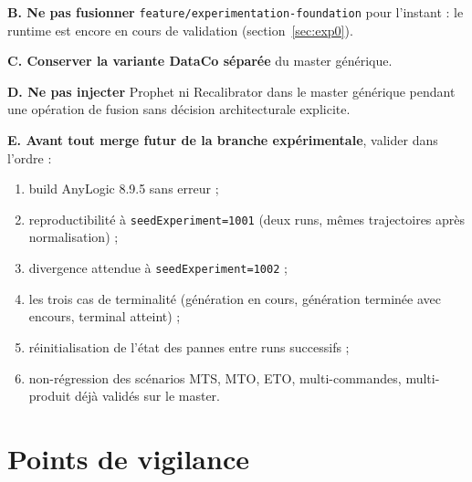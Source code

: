 \documentclass[11pt,a4paper]{article}
\newcommand{\code}[1]{\texttt{#1}}
\begin{document}
\textbf{B. Ne pas fusionner} \code{feature/experimentation-foundation}
pour l'instant : le runtime est encore en cours de validation
(section~\ref{sec:exp0}).

\textbf{C. Conserver la variante DataCo séparée} du master générique.

\textbf{D. Ne pas injecter} Prophet ni Recalibrator dans le master
générique pendant une opération de fusion sans décision architecturale
explicite.

\textbf{E. Avant tout merge futur de la branche expérimentale}, valider
dans l'ordre :

\begin{enumerate}
  \item build AnyLogic 8.9.5 sans erreur ;
  \item reproductibilité à \code{seedExperiment=1001} (deux runs, mêmes
        trajectoires après normalisation) ;
  \item divergence attendue à \code{seedExperiment=1002} ;
  \item les trois cas de terminalité (génération en cours, génération
        terminée avec encours, terminal atteint) ;
  \item réinitialisation de l'état des pannes entre runs successifs ;
  \item non-régression des scénarios MTS, MTO, ETO, multi-commandes,
        multi-produit déjà validés sur le master.
\end{enumerate}

\section{Points de vigilance}
\end{document}
